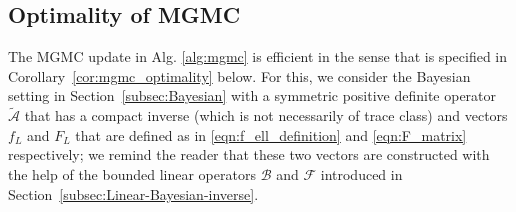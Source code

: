 \documentclass[11pt,english]{article}
\theoremstyle{plain}
\theoremstyle{plain}
\theoremstyle{plain}
\theoremstyle{plain}
\numberwithin{equation}{section}
\begin{document}
\subsection{Optimality of MGMC}\label{sec:optimality}
The MGMC update in Alg. \ref{alg:mgmc} is efficient in the sense that is specified in Corollary~\ref{cor:mgmc_optimality} below. For this, we consider the Bayesian setting in Section~\ref{subsec:Bayesian} with a symmetric positive definite operator $\widetilde{\mathcal{A}}$ that has a compact inverse (which is not necessarily of trace class) and vectors $f_L$ and $F_L$ that are defined as in \eqref{eqn:f_ell_definition} and \eqref{eqn:F_matrix} respectively; we remind the reader that these two vectors are constructed with the help of the bounded linear operators $\mathcal{B}$ and $\mathcal{F}$ introduced in Section~\ref{subsec:Linear-Bayesian-inverse}.
\end{document}
